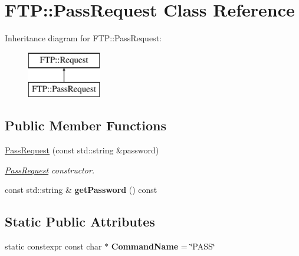 \hypertarget{class_f_t_p_1_1_pass_request}{\section{F\-T\-P\-:\-:Pass\-Request Class Reference}
\label{class_f_t_p_1_1_pass_request}
}
Inheritance diagram for F\-T\-P\-:\-:Pass\-Request\-:\begin{figure}[H]
\begin{center}
\leavevmode
\includegraphics[height=2.000000cm]{class_f_t_p_1_1_pass_request}
\end{center}
\end{figure}
\subsection*{Public Member Functions}
\begin{DoxyCompactItemize}
\item 
\hyperlink{class_f_t_p_1_1_pass_request_a4eb653d4dfd503f9389f5307dd3b802c}{Pass\-Request} (const std\-::string \&password)
\begin{DoxyCompactList}\small\item\em \hyperlink{class_f_t_p_1_1_pass_request}{Pass\-Request} constructor. \end{DoxyCompactList}\item 
\hypertarget{class_f_t_p_1_1_pass_request_a43b1f3a580fc4492cb90713b9a79e537}{const std\-::string \& {\bfseries get\-Password} () const }\label{class_f_t_p_1_1_pass_request_a43b1f3a580fc4492cb90713b9a79e537}

\end{DoxyCompactItemize}
\subsection*{Static Public Attributes}
\begin{DoxyCompactItemize}
\item 
\hypertarget{class_f_t_p_1_1_pass_request_a17183488e2afd35b11bb970f113e7807}{static constexpr const char $\ast$ {\bfseries Command\-Name} = \char`\"{}P\-A\-S\-S\char`\"{}}\label{class_f_t_p_1_1_pass_request_a17183488e2afd35b11bb970f113e7807}

\end{DoxyCompactItemize}


